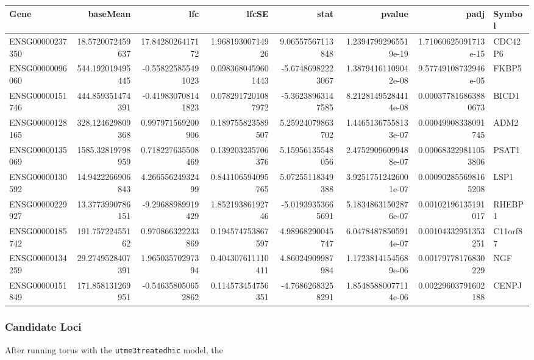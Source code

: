 \begin{center}
\begin{tabular}{lrrrrrrl}
Gene & baseMean & lfc & lfcSE & stat & pvalue & padj & Symbol\\
\hline
ENSG00000237350 & 18.5720072459637 & 17.8428026417172 & 1.96819300714926 & 9.06557567113848 & 1.23947992965519e-19 & 1.71060625091713e-15 & CDC42P6\\
ENSG00000096060 & 544.192019495445 & -0.558225855491023 & 0.0983680459601443 & -5.67486982223067 & 1.38794161109042e-08 & 9.57749108732946e-05 & FKBP5\\
ENSG00000151746 & 444.859351474391 & -0.419830708141823 & 0.0782917201087972 & -5.36238963147585 & 8.21281495284414e-08 & 0.000377816863880673 & BICD1\\
ENSG00000128165 & 328.124629809368 & 0.997971569200906 & 0.189755823589507 & 5.25924079863702 & 1.44651367558133e-07 & 0.00049908338091745 & ADM2\\
ENSG00000135069 & 1585.32819798959 & 0.718227635508469 & 0.139203235706376 & 5.15956135548056 & 2.47529096099488e-07 & 0.000683229811053806 & PSAT1\\
ENSG00000130592 & 14.9422266906843 & 4.26655624932499 & 0.841106594095765 & 5.07255118349388 & 3.92517512426001e-07 & 0.000902855698165208 & LSP1\\
ENSG00000229927 & 13.3773990786151 & -9.29688989919429 & 1.85219386192746 & -5.01939353665691 & 5.18348631502876e-07 & 0.00102196135191017 & RHEBP1\\
ENSG00000185742 & 191.75722455162 & 0.970866322233869 & 0.194574753867597 & 4.98968290045747 & 6.04784878505914e-07 & 0.00104332951353251 & C11orf87\\
ENSG00000134259 & 29.2749528407391 & 1.96503570297394 & 0.404307611110411 & 4.86024909987984 & 1.17238141545689e-06 & 0.00179778176830229 & NGF\\
ENSG00000151849 & 171.858131269951 & -0.546358050652862 & 0.114573454756351 & -4.76862683258291 & 1.85485880077114e-06 & 0.00229603791602188 & CENPJ\\
\end{tabular}
\end{center}




\subsubsection*{Candidate Loci}
\label{sec:org91a5cf4}


After running torus with the \texttt{utme3treatedhic} model, the 

